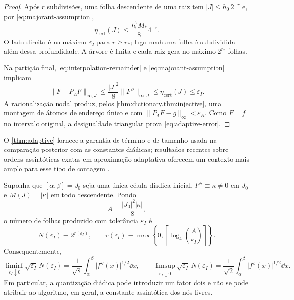 \begin{proof}
Após $r$ subdivisões, uma folha descendente de uma raiz tem $|J|\le h_0\,2^{-r}$ e, por \eqref{eq:majorant-assumption},
\[
 \eta_{\mathrm{cert}}(J)\le\frac{h_0^2M_*}{8}4^{-r}.
\]
O lado direito é no máximo $\varepsilon_I$ para $r\ge r_*$; logo nenhuma folha é subdividida além dessa profundidade. A árvore é finita e cada raiz gera no máximo $2^{r_*}$ folhas.

Na partição final, \eqref{eq:interpolation-remainder} e \eqref{eq:majorant-assumption} implicam
\[
 \|F-P_\Lambda F\|_{\infty,J}
 \le\frac{|J|^2}{8}\|F''\|_{\infty,J}
 \le\eta_{\mathrm{cert}}(J)\le\varepsilon_I.
\]
A racionalização nodal produz, pelos \cref{thm:dictionary,thm:injective}, uma montagem de átomos de endereço único e com $\|P_\Lambda F-g\|_\infty<\varepsilon_R$. Como $F=f$ no intervalo original, a desigualdade triangular prova \eqref{eq:adaptive-error}.
\end{proof}

O \cref{thm:adaptive} fornece a garantia de término e de tamanho usada na
comparação posterior com as constantes diádicas; resultados recentes sobre
ordens assintóticas exatas em aproximação adaptativa oferecem um contexto mais
amplo para esse tipo de contagem \citep{kessebohmerniemann2025}.

\begin{proposition}
\label{prop:adaptive-dyadic-oscillation}
Suponha que $[\alpha,\beta]=J_0$ seja uma única célula diádica inicial,
$F''\equiv\kappa\ne0$ em $J_0$ e $M(J)=|\kappa|$ em todo descendente.
Pondo
\[
 A=\frac{|J_0|^2|\kappa|}{8},
\]
o número de folhas produzido com tolerância $\varepsilon_I$ é
\begin{equation}
 N(\varepsilon_I)=2^{r(\varepsilon_I)},\qquad
 r(\varepsilon_I)=
 \max\!\left\{0,\left\lceil\log_4\!\left(\frac{A}{\varepsilon_I}\right)\right\rceil\right\}.
 \label{eq:constant-curvature-leaves}
\end{equation}
Consequentemente,
\begin{equation}
 \liminf_{\varepsilon_I\downarrow0}\sqrt{\varepsilon_I}\,N(\varepsilon_I)
 =\frac1{\sqrt8}\int_\alpha^\beta |f''(x)|^{1/2}\dd x,
 \qquad
 \limsup_{\varepsilon_I\downarrow0}\sqrt{\varepsilon_I}\,N(\varepsilon_I)
 =\frac1{\sqrt2}\int_\alpha^\beta |f''(x)|^{1/2}\dd x.
 \label{eq:constant-curvature-oscillation}
\end{equation}
Em particular, a quantização diádica pode introduzir um fator dois e não se
pode atribuir ao algoritmo, em geral, a constante assintótica dos nós livres.
\end{proposition}

